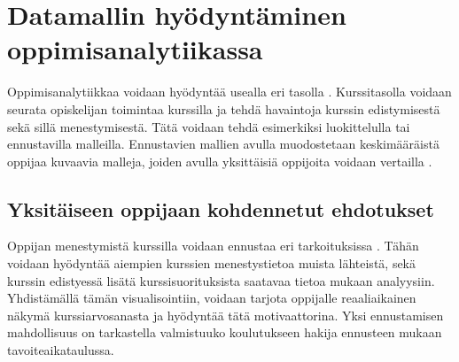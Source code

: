 \chapter{Datamallin hyödyntäminen oppimisanalytiikassa\label{hyodyntaminen}}

Oppimisanalytiikkaa voidaan hyödyntää usealla eri tasolla \citep{longPenetratingFogAnalytics2011,siemensLearningAnalyticsEmergence2013}. Kurssitasolla voidaan seurata opiskelijan toimintaa kurssilla ja tehdä havaintoja kurssin edistymisestä sekä sillä menestymisestä. Tätä voidaan tehdä esimerkiksi luokittelulla tai ennustavilla malleilla.
Ennustavien mallien avulla muodostetaan keskimääräistä oppijaa kuvaavia malleja, joiden avulla yksittäisiä oppijoita voidaan vertailla \citep{wolffImprovingRetentionPredicting2013}.

\section{Yksitäiseen oppijaan kohdennetut ehdotukset}


Oppijan menestymistä kurssilla voidaan ennustaa eri tarkoituksissa \citep{barberCourseCorrectionUsing2012a}. Tähän voidaan hyödyntää aiempien kurssien menestystietoa muista lähteistä, sekä kurssin edistyessä lisätä kurssisuorituksista saatavaa tietoa mukaan analyysiin. Yhdistämällä tämän visualisointiin, voidaan tarjota oppijalle reaaliaikainen näkymä kurssiarvosanasta ja hyödyntää tätä motivaattorina. Yksi ennustamisen mahdollisuus on tarkastella valmistuuko koulutukseen hakija ennusteen mukaan tavoiteaikataulussa.

